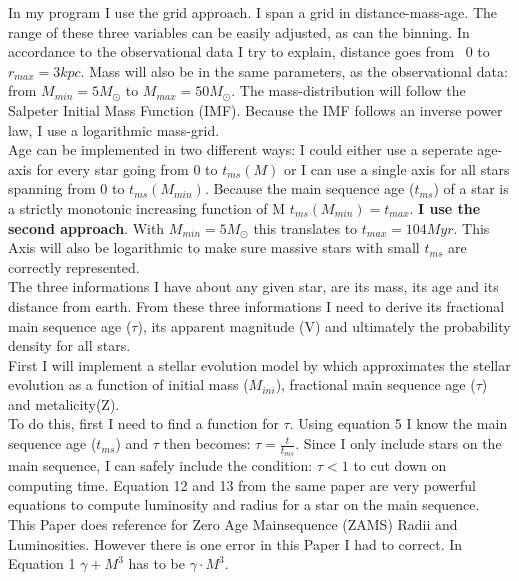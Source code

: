 \documentclass[a4paper,10pt]{article}
\begin{document}
 In my program I use the grid approach. I span a grid in distance-mass-age. The range of these three
 variables can be easily adjusted, as can the binning. In accordance to the observational data I try to explain, distance goes from \
 0 to $r_{max}=3kpc$. Mass will also be in the same parameters, as the observational data:
 from $M_{min}=5M_\odot$ to $M_{max}=50M_\odot$. The mass-distribution will follow the Salpeter Initial Mass Function (IMF)\citep[see][]{1955ApJ...121..161S}.
 Because the IMF follows an inverse power law, I use a logarithmic mass-grid.\\
 Age can be implemented in two different ways: I could either use a seperate age-axis for every star going from 0 to $t_{ms}(M)$ or I can
 use a single axis for all stars spanning from 0 to $t_{ms}(M_{min})$. Because the main sequence age ($t_{ms}$) of a star 
 is a strictly monotonic increasing function of M $t_{ms}(M_{min})=t_{max}$. \textbf{I use the second approach}. With $M_{min}=5M_\odot$ this 
 translates to $t_{max}=104Myr$. This Axis will also be logarithmic to make sure massive stars with small $t_{ms}$ are correctly
 represented. \\
 The three informations I have about any given star, are its mass, its age and its distance from earth. From these three informations
 I need to derive its fractional main sequence age ($\tau$), its apparent magnitude (V) and ultimately the probability density
 for all stars.\\ 
 First I will implement a stellar evolution model by \citet*{2000MNRAS.315..543H} which approximates the stellar evolution as a 
 function of initial mass ($M_{ini}$), fractional main sequence age ($\tau$) and metalicity(Z). \\
 To do this, first I need to find a function for $\tau$. Using equation 5 \citep[page 547]{2000MNRAS.315..543H} I know the main sequence age 
 ($t_{ms}$) and $\tau$ then becomes: $\tau=\frac{t}{t_{ms}}$. Since I only include stars on the main sequence, I can safely include
 the condition: $\tau<1$ to cut down on computing time.
 Equation 12 and 13 from the same paper are very powerful equations to compute luminosity and radius for a star on the main sequence.\\
 This Paper does reference \citet*{1996MNRAS.281..257T} for Zero Age Mainsequence (ZAMS) Radii and Luminosities. However there is one 
 error in this Paper I had to correct. In Equation 1 $\gamma + M^3$ has to be $\gamma \cdot M^3$.\\
\end{document}
